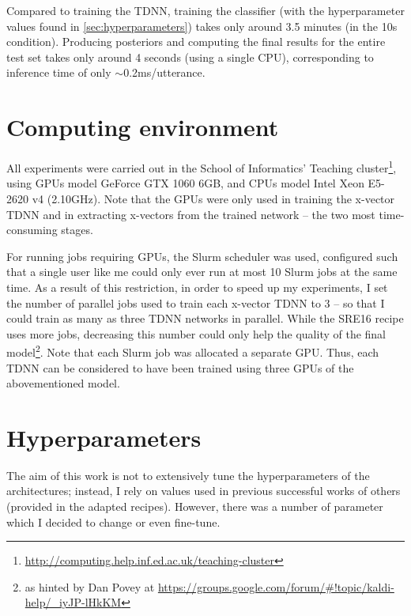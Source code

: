 \documentclass[bsc,frontabs,twoside,singlespacing,parskip,deptreport]{infthesis}
\begin{document}
{{{      Compared to training the TDNN, training the classifier (with the hyperparameter values found in \autoref{sec:hyperparameters}) takes only around 3.5 minutes (in the 10s condition). Producing posteriors and computing the final results for the entire test set takes only around 4 seconds (using a single CPU), corresponding to inference time of only $\sim$0.2ms/utterance.
    }
  }

  \section{Computing environment}{
    \label{sec:computing-environment}
    All experiments were carried out in the School of Informatics' Teaching cluster\footnote{\url{http://computing.help.inf.ed.ac.uk/teaching-cluster}}, using GPUs model GeForce GTX 1060 6GB, and CPUs model Intel Xeon E5-2620 v4 (2.10GHz). Note that the GPUs were only used in training the x-vector TDNN and in extracting x-vectors from the trained network -- the two most time-consuming stages.
    
    For running jobs requiring GPUs, the Slurm scheduler was used, configured such that a single user like me could only ever run at most 10 Slurm jobs at the same time. As a result of this restriction, in order to speed up my experiments, I set the number of parallel jobs used to train each x-vector TDNN to 3 -- so that I could train as many as three TDNN networks in parallel. While the SRE16 recipe uses more jobs, decreasing this number could only help the quality of the final model\footnote{as hinted by Dan Povey at \url{https://groups.google.com/forum/\#!topic/kaldi-help/_iyJP-lHkKM}}.
    Note that each Slurm job was allocated a separate GPU. Thus, each TDNN can be considered to have been trained using three GPUs of the abovementioned model.
  }

  \section{Hyperparameters}{
    \label{sec:hyperparameters}

    The aim of this work is not to extensively tune the hyperparameters of the architectures; instead, I rely on values used in previous successful works of others (provided in the adapted recipes). However, there was a number of parameter which I decided to change or even fine-tune.

}}
\end{document}
